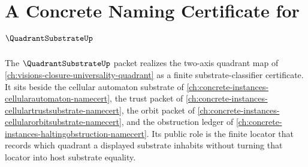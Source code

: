 \chapter{A Concrete Naming Certificate for $\QuadrantSubstrateUp$}
\label{ch:concrete-instances-quadrantsubstrate-namecert}

The $\QuadrantSubstrateUp$ packet realizes the two-axis quadrant map of \autoref{ch:visions-closure-universality-quadrant} as a finite substrate-classifier certificate. It sits beside the cellular automaton substrate of \autoref{ch:concrete-instances-cellularautomaton-namecert}, the trust packet of \autoref{ch:concrete-instances-cellulartrustsubstrate-namecert}, the orbit packet of \autoref{ch:concrete-instances-cellularorbitsubstrate-namecert}, and the obstruction ledger of \autoref{ch:concrete-instances-haltingobstruction-namecert}. Its public role is the finite locator that records which quadrant a displayed substrate inhabits without turning that locator into host substrate equality.



